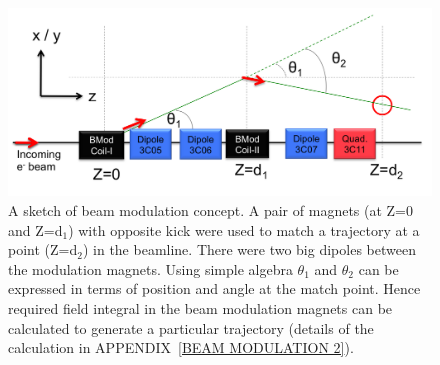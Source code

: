 \begin{singlespace}
\begin{figure}[!h]
	\begin{center}
	\includegraphics[width=15.0cm]{figures/BModDrawing}
	\end{center}
	\caption
	{A sketch of beam modulation concept. A pair of magnets (at Z=0 and Z=d$_{1}$) with opposite kick were used to match a trajectory at a point (Z=d$_{2}$) in the beamline. There were two big dipoles between the modulation magnets. Using simple algebra $\theta_{1}$ and $\theta_{2}$ can be expressed in terms of position and angle at the match point. Hence required field integral in the beam modulation magnets can be calculated to generate a particular trajectory (details of the calculation in APPENDIX~\ref{BEAM MODULATION 2}).}
	\label{fig:BModDrawing}
\end{figure}
\end{singlespace}

